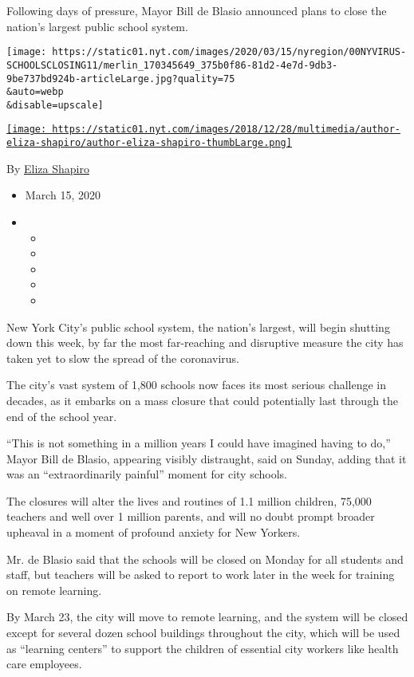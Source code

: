 Following days of pressure, Mayor Bill de Blasio announced plans to
close the nation's largest public school system.

\texttt{[image: https://static01.nyt.com/images/2020/03/15/nyregion/00NYVIRUS-SCHOOLSCLOSING11/merlin\_170345649\_375b0f86-81d2-4e7d-9db3-9be737bd924b-articleLarge.jpg?quality=75\\\&auto=webp\\\&disable=upscale]}

\href{https://www.nytimes.com/by/eliza-shapiro}{\texttt{[image: https://static01.nyt.com/images/2018/12/28/multimedia/author-eliza-shapiro/author-eliza-shapiro-thumbLarge.png]}}

By \href{https://www.nytimes.com/by/eliza-shapiro}{Eliza Shapiro}

\begin{itemize}
\item
  March 15, 2020
\item
  \begin{itemize}
  \item
  \item
  \item
  \item
  \item
  \end{itemize}
\end{itemize}

New York City's public school system, the nation's largest, will begin
shutting down this week, by far the most far-reaching and disruptive
measure the city has taken yet to slow the spread of the coronavirus.

The city's vast system of 1,800 schools now faces its most serious
challenge in decades, as it embarks on a mass closure that could
potentially last through the end of the school year.

``This is not something in a million years I could have imagined having
to do,'' Mayor Bill de Blasio, appearing visibly distraught, said on
Sunday, adding that it was an ``extraordinarily painful'' moment for
city schools.

The closures will alter the lives and routines of 1.1 million children,
75,000 teachers and well over 1 million parents, and will no doubt
prompt broader upheaval in a moment of profound anxiety for New Yorkers.

Mr. de Blasio said that the schools will be closed on Monday for all
students and staff, but teachers will be asked to report to work later
in the week for training on remote learning.

By March 23, the city will move to remote learning, and the system will
be closed except for several dozen school buildings throughout the city,
which will be used as ``learning centers'' to support the children of
essential city workers like health care employees.

